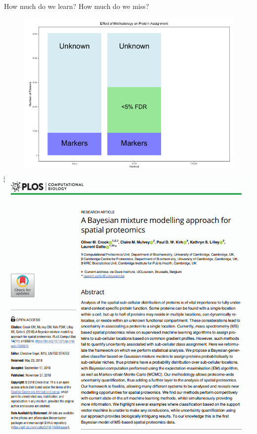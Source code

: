 \begin{frame}{How much do we learn? How much do we miss?}
  \begin{figure}
    \includegraphics[width=.8\linewidth]{./figs_all/preConcludePlot.png}
  \end{figure}
\end{frame}

\begin{frame}{}
\includegraphics[width=1\linewidth]{./figs_more/plostagm.png}
\end{frame}


